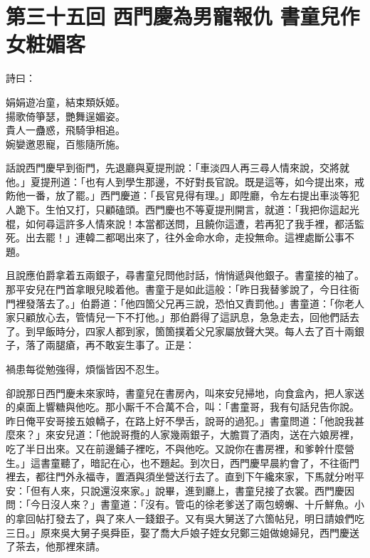 
\chapter*{第三十五回 西門慶為男寵報仇 書童兒作女粧媚客}


詩曰：

\begin{myquote} 
娟娟遊冶童，結束類妖姬。\\揚歌倚箏瑟，艷舞逞媚姿。\\貴人一蠱惑，飛騎爭相追。\\婉孌邀恩寵，百態隨所施。
\end{myquote} 

話說西門慶早到衙門，先退廳與夏提刑說：「車淡四人再三尋人情來說，交將就他。」夏提刑道：「也有人到學生那邊，不好對長官說。既是這等，如今提出來，戒飭他一番，放了罷。」西門慶道：「長官見得有理。」即陞廳，令左右提出車淡等犯人跪下。生怕又打，只顧磕頭。西門慶也不等夏提刑開言，就道：「我把你這起光棍，如何尋這許多人情來說！本當都送問，且饒你這遭，若再犯了我手裡，都活監死。出去罷！」連韓二都喝出來了，往外金命水命，走投無命。這裡處斷公事不題。

且說應伯爵拿着五兩銀子，尋書童兒問他討話，悄悄遞與他銀子。書童接的袖了。那平安兒在門首拿眼兒睃着他。書童于是如此這般：「昨日我替爹說了，今日往衙門裡發落去了。」伯爵道：「他四箇父兄再三說，恐怕又責罰他。」書童道：「你老人家只顧放心去，管情兒一下不打他。」那伯爵得了這訊息，急急走去，回他們話去了。到早飯時分，四家人都到家，箇箇撲着父兄家屬放聲大哭。每人去了百十兩銀子，落了兩腿瘡，再不敢妄生事了。{}正是：

\begin{myquote} 
禍患每從勉強得，煩惱皆因不忍生。
\end{myquote} 

卻說那日西門慶未來家時，書童兒在書房內，叫來安兒掃地，向食盒內，把人家送的桌面上響糖與他吃。{}那小厮千不合萬不合，叫：「書童哥，我有句話兒告你說。昨日俺平安哥接五娘轎子，在路上好不學舌，說哥的過犯。」書童問道：「他說我甚麼來？」來安兒道：「他說哥攬的人家幾兩銀子，大膽買了酒肉，送在六娘房裡，吃了半日出來。又在前邊鋪子裡吃，不與他吃。{}又說你在書房裡，和爹幹什麼營生。」這書童聽了，暗記在心，也不題起。到次日，西門慶早晨約會了，不往衙門裡去，都往門外永福寺，置酒與須坐營送行去了。直到下午纔來家，下馬就分咐平安：「但有人來，只說還沒來家。」說畢，進到廳上，書童兒接了衣裳。西門慶因問：「今日沒人來？」書童道：「沒有。管屯的徐老爹送了兩包螃蠏、十斤鮮魚。小的拿回帖打發去了，與了來人一錢銀子。又有吳大舅送了六箇帖兒，明日請娘們吃三日。」原來吳大舅子吳舜臣，娶了喬大戶娘子姪女兒鄭三姐做媳婦兒，西門慶送了茶去，他那裡來請。

